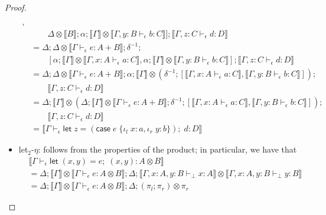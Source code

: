 \documentclass[acmsmall,screen,review]{acmart}
\newcommand{\ms}[1]{\ensuremath{\mathsf{#1}}}
\newcommand{\lto}{:}
\newcommand{\linl}[1]{\iota_l\;{#1}}
\newcommand{\linr}[1]{\iota_r\;{#1}}
\newcommand{\letexpr}[3]{\ensuremath{\ms{let}\;#1 = #2;\;#3}}
\newcommand{\caseexpr}[5]{\ms{case}\;#1\;\{\linl{#2} \lto #3, \linr{#4} \lto #5\}}
\newcommand{\bhyp}[2]{#1 : #2}
\newcommand{\hasty}[4]{#1 \vdash_{#2} #3: {#4}}
\newcommand{\brle}[1]{{\textsf{#1}}}
\newcommand{\dnt}[1]{\llbracket{#1}\rrbracket}
\begin{document}
\begin{proof}
\begin{itemize}[leftmargin=*]
\begin{align*}
            ,
      \\  & \qquad \Delta \otimes \dnt{B} ; \alpha
            ; \dnt{\Gamma} \otimes \dnt{\hasty{\Gamma, \bhyp{y}{B}}{\epsilon}{b}{C}}
        ] ; \dnt{\hasty{\Gamma, \bhyp{z}{C}}{\epsilon}{d}{D}}
      \\ &= \Delta ; \Delta \otimes \dnt{\hasty{\Gamma}{\epsilon}{e}{A + B}} ; \delta^{-1} ; 
      \\ & \qquad [
            \alpha ; \dnt{\Gamma} \otimes \dnt{\hasty{\Gamma, \bhyp{x}{A}}{\epsilon}{a}{C}},
            \alpha ; \dnt{\Gamma} \otimes \dnt{\hasty{\Gamma, \bhyp{y}{B}}{\epsilon}{b}{C}}
        ] ; \dnt{\hasty{\Gamma, \bhyp{z}{C}}{\epsilon}{d}{D}}
      \\ &= \Delta ; \Delta \otimes \dnt{\hasty{\Gamma}{\epsilon}{e}{A + B}}  
                   ; \alpha ; \dnt{\Gamma} \otimes (\delta^{-1} ; [
                        \dnt{\hasty{\Gamma, \bhyp{x}{A}}{\epsilon}{a}{C}},
                        \dnt{\hasty{\Gamma, \bhyp{y}{B}}{\epsilon}{b}{C}}
                    ]) ;
      \\ & \qquad \dnt{\hasty{\Gamma, \bhyp{z}{C}}{\epsilon}{d}{D}}
      \\ &= \Delta ; \dnt{\Gamma} \otimes (
                  \Delta ; \dnt{\Gamma} \otimes \dnt{\hasty{\Gamma}{\epsilon}{e}{A + B}} ;
                  \delta^{-1} ; [
                        \dnt{\hasty{\Gamma, \bhyp{x}{A}}{\epsilon}{a}{C}},
                        \dnt{\hasty{\Gamma, \bhyp{y}{B}}{\epsilon}{b}{C}}
                    ]) ;
      \\ & \qquad \dnt{\hasty{\Gamma, \bhyp{z}{C}}{\epsilon}{d}{D}}
      \\ &= \dnt{\hasty{\Gamma}{\epsilon}{\letexpr{z}{(\caseexpr{e}{x}{a}{y}{b})}{d}}{D}}
    \end{align*}
    \item \brle{let$_2$-$\eta$}: follows from the properties of the product; in particular,
    we have that
    \begin{align*}
      &\dnt{\hasty{\Gamma}{\epsilon}{\letexpr{(x, y)}{e}{(x, y)}}{A \otimes B}} \\
      &= \Delta ; \dnt{\Gamma} \otimes \dnt{\hasty{\Gamma}{\epsilon}{e}{A \otimes B}}
                ; \Delta ; 
                \dnt{\hasty{\Gamma, \bhyp{x}{A}, \bhyp{y}{B}}{\bot}{x}{A}} \otimes
                \dnt{\hasty{\Gamma, \bhyp{x}{A}, \bhyp{y}{B}}{\bot}{y}{B}} \\
      &= \Delta ; \dnt{\Gamma} \otimes \dnt{\hasty{\Gamma}{\epsilon}{e}{A \otimes B}}
                ; \Delta ; (\pi_l ; \pi_r) \otimes \pi_r

\end{align*}
\end{itemize}
\end{proof}
\end{document}
